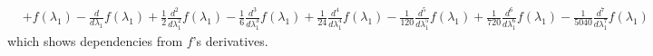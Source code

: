 \begin{displaymath}
\begin{split}
                     &+ f{\left (\lambda_{1} \right )} - \frac{d}{d \lambda_{1}} f{\left (\lambda_{1} \right )} + \frac{1}{2} \frac{d^{2}}{d \lambda_{1}^{2}}  f{\left (\lambda_{1} \right )} - \frac{1}{6} \frac{d^{3}}{d \lambda_{1}^{3}}  f{\left (\lambda_{1} \right )} + \frac{1}{24} \frac{d^{4}}{d \lambda_{1}^{4}}  f{\left (\lambda_{1} \right )} - \frac{1}{120} \frac{d^{5}}{d \lambda_{1}^{5}}  f{\left (\lambda_{1} \right )} + \frac{1}{720} \frac{d^{6}}{d \lambda_{1}^{6}}  f{\left (\lambda_{1} \right )} - \frac{1}{5040} \frac{d^{7}}{d \lambda_{1}^{7}}  f{\left (\lambda_{1} \right )}
\end{split}
\end{displaymath}
which shows dependencies from $f$'s derivatives.

